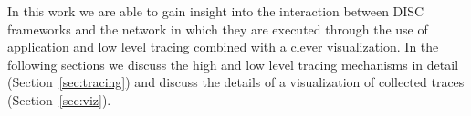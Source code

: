 In this work we are able to gain insight into the interaction between DISC 
frameworks and the network in which they are executed through the use of
application and low level tracing combined with a clever visualization. In the 
following sections we discuss the high and low level tracing mechanisms in 
detail (Section~\ref{sec:tracing}) and discuss the details of a visualization of 
collected traces (Section~\ref{sec:viz}).
